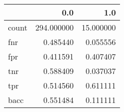 \begin{tabular}{lrr}
\toprule
{} &         0.0 &        1.0 \\
\midrule
count &  294.000000 &  15.000000 \\
fnr   &    0.485440 &   0.055556 \\
fpr   &    0.411591 &   0.407407 \\
tnr   &    0.588409 &   0.037037 \\
tpr   &    0.514560 &   0.611111 \\
bacc  &    0.551484 &   0.111111 \\
\bottomrule
\end{tabular}
